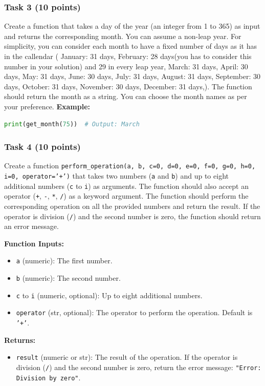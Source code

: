 \documentclass[12pt]{book}
\begin{document}
\subsubsection{Task 3 (10 points)}
Create a function that takes a day of the year (an integer from 1 to 365) as input and returns the corresponding month. You can assume a non-leap year. For simplicity, you can consider each month to have a fixed number of days as it has in the callendar (
    January: 31 days,
    February: 28 days(you has to consider this number in your solution) and 29 in every leap year,
    March: 31 days,
    April: 30 days,
    May: 31 days,
    June: 30 days,
    July: 31 days,
    August: 31 days,
    September: 30 days,
    October: 31 days,
    November: 30 days,
    December: 31 days,). The function should return the month as a string. You can choose the month names as per your preference.
\textbf{Example:}
\begin{lstlisting}[language=Python]
print(get_month(75))  # Output: March
\end{lstlisting}


\subsubsection{Task 4 (10 points)}
Create a function \texttt{perform\_operation(a, b, c=0, d=0, e=0, f=0, g=0, h=0, i=0, operator='+')} that takes two numbers (\texttt{a} and \texttt{b}) and up to eight additional numbers (\texttt{c} to \texttt{i}) as arguments. The function should also accept an operator (\texttt{+}, \texttt{-}, \texttt{*}, \texttt{/}) as a keyword argument. The function should perform the corresponding operation on all the provided numbers and return the result. If the operator is division (\texttt{/}) and the second number is zero, the function should return an error message.

\textbf{Function Inputs:}
\begin{itemize}
\item \texttt{a} (numeric): The first number.
\item \texttt{b} (numeric): The second number.
\item \texttt{c} to \texttt{i} (numeric, optional): Up to eight additional numbers.
\item \texttt{operator} (str, optional): The operator to perform the operation. Default is \texttt{'+'}.
\end{itemize}

\textbf{Returns:}
\begin{itemize}
\item \texttt{result} (numeric or str): The result of the operation. If the operator is division (\texttt{/}) and the second number is zero, return the error message: \texttt{"Error: Division by zero"}.
\end{itemize}
\end{document}
